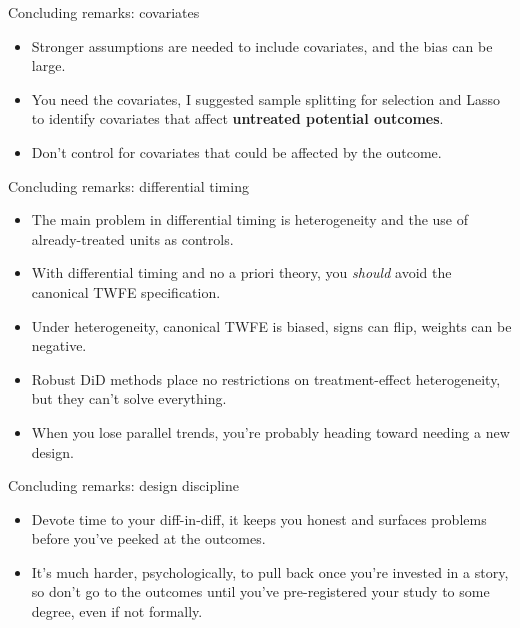 \documentclass[aspectratio=169,11pt]{beamer}
\begin{document}
\begin{frame}{Concluding remarks: covariates}
\vspace{0.4em}
\begin{itemize}\setlength\itemsep{0.55em}
  \item Stronger assumptions are needed to include covariates, and the bias can be large.
  \item You need the  covariates, I suggested sample splitting for selection and Lasso to identify covariates that affect \textbf{untreated potential outcomes}.
  \item Don't control for covariates that could be affected by the outcome.
\end{itemize}
\end{frame}

\begin{frame}{Concluding remarks: differential timing}
\vspace{0.3em}
\begin{itemize}\small\setlength\itemsep{0.45em}
  \item The main problem in differential timing is heterogeneity and the use of already-treated units as controls.
  \item With differential timing and no a priori theory, you \emph{should} avoid the canonical TWFE specification.
  \item Under heterogeneity, canonical TWFE is biased, signs can flip, weights can be negative.
  \item Robust DiD methods place no restrictions on treatment-effect heterogeneity, but they can't solve everything.
  \item When you lose parallel trends, you're probably heading toward needing a new design.
\end{itemize}
\end{frame}

\begin{frame}{Concluding remarks: design discipline}
\vspace{0.5em}
\begin{itemize}\setlength\itemsep{0.6em}
  \item Devote time to  your diff-in-diff, it keeps you honest and surfaces problems before you've peeked at the outcomes.
  \item It's much harder, psychologically, to pull back once you're invested in a story, so don't go to the outcomes until you've pre-registered your study to some degree, even if not formally.
\end{itemize}
\end{frame}
\end{document}
